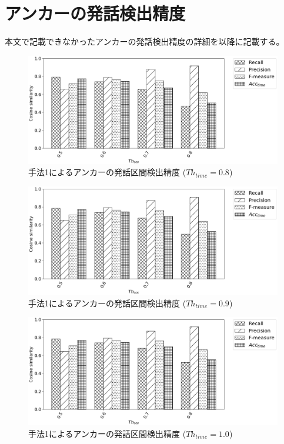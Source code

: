 \chapter{アンカーの発話検出精度}
本文で記載できなかったアンカーの発話検出精度の詳細を以降に記載する。

\begin{figure}[H]
  \begin{center}
    \includegraphics[scale=0.5]{./figure/prob1_08.eps}
  \end{center}
  \caption{手法1によるアンカーの発話区間検出精度 ($Th_{time}=0.8$)}
\end{figure}

\begin{figure}[H]
  \begin{center}
    \includegraphics[scale=0.5]{./figure/prob1_09.eps}
  \end{center}
  \caption{手法1によるアンカーの発話区間検出精度 ($Th_{time}=0.9$)}
\end{figure}

\begin{figure}[H]
  \begin{center}
    \includegraphics[scale=0.5]{./figure/prob1_10.eps}
  \end{center}
  \caption{手法1によるアンカーの発話区間検出精度 ($Th_{time}=1.0$)}
\end{figure}

